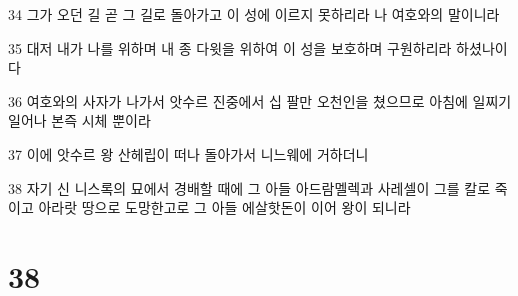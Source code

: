 \par 34 그가 오던 길 곧 그 길로 돌아가고 이 성에 이르지 못하리라 나 여호와의 말이니라
\par 35 대저 내가 나를 위하며 내 종 다윗을 위하여 이 성을 보호하며 구원하리라 하셨나이다
\par 36 여호와의 사자가 나가서 앗수르 진중에서 십 팔만 오천인을 쳤으므로 아침에 일찌기 일어나 본즉 시체 뿐이라
\par 37 이에 앗수르 왕 산헤립이 떠나 돌아가서 니느웨에 거하더니
\par 38 자기 신 니스록의 묘에서 경배할 때에 그 아들 아드람멜렉과 사레셀이 그를 칼로 죽이고 아라랏 땅으로 도망한고로 그 아들 에살핫돈이 이어 왕이 되니라

\chapter{38}

